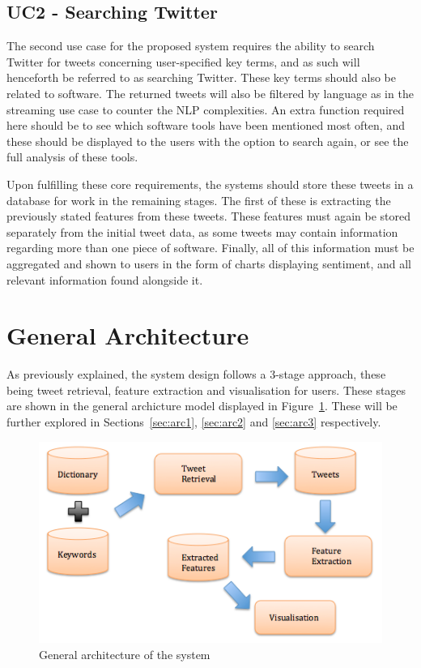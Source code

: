\subsection[Use Case 2]{UC2 - Searching Twitter}
The second use case for the proposed system requires the ability to search Twitter for tweets concerning user-specified key terms, and as such will henceforth be referred to as searching Twitter. These key terms should also be related to software. The returned tweets will also be filtered by language as in the streaming use case to counter the NLP complexities. An extra function required here should be to see which software tools have been mentioned most often, and these should be displayed to the users with the option to search again, or see the full analysis of these tools.


Upon fulfilling these core requirements, the systems should store these tweets in a database for work in the remaining stages. The first of these is extracting the previously stated features from these tweets. These features must again be stored separately from the initial tweet data, as some tweets may contain information regarding more than one piece of software. Finally, all of this information must be aggregated and shown to users in the form of charts displaying sentiment, and all relevant information found alongside it.


\section{General Architecture}
As previously explained, the system design follows a 3-stage approach, these being tweet retrieval, feature extraction and visualisation for users. These stages are shown in the general archicture model displayed in Figure~\ref{fig:general}. These will be further explored in Sections~\ref{sec:arc1}, \ref{sec:arc2} and \ref{sec:arc3} respectively.

\begin{figure}[h]
\begin{center}
\includegraphics[width=12cm]{design}
\end{center}
\caption{General architecture of the system}
\label{fig:general}
\end{figure}

